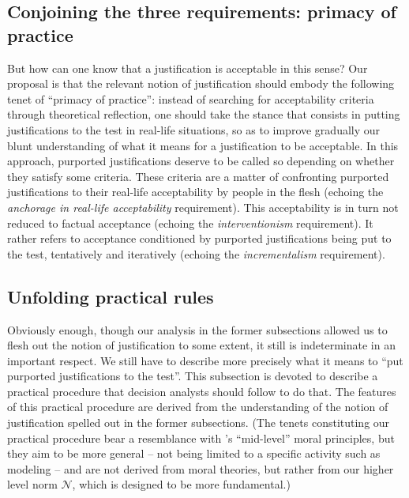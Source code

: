 \documentclass[preprint, french, english, 11pt, authoryear]{elsarticle}%
\begin{document}
\subsection{Conjoining the three requirements: primacy of practice}
But how can one know that a justification is acceptable in this sense? %
Our proposal is that the relevant notion of justification should embody the following tenet of “primacy of practice”: instead of searching for acceptability criteria through theoretical reflection, one should take the stance that consists in putting justifications to the test in real-life situations, so as to improve gradually our blunt understanding of what it means for a justification to be acceptable. In this approach, purported justifications deserve to be called so depending on whether they satisfy some criteria. These criteria are a matter of confronting purported justifications to their real-life acceptability by people in the flesh (echoing the \emph{anchorage in real-life acceptability} requirement). This acceptability is in turn not reduced to factual acceptance (echoing the \emph{interventionism} requirement). It rather refers to acceptance conditioned by purported justifications being put to the test, tentatively and iteratively (echoing the \emph{incrementalism} requirement).

\subsection{Unfolding practical rules}
Obviously enough, though our analysis in the former subsections allowed us to flesh out the notion of justification to some extent, it still is indeterminate in an important respect. We still have to describe more precisely what it means to ``put purported justifications to the test''. This subsection is devoted to describe a practical procedure that decision analysts should follow to do that. The features of this practical procedure are derived from the understanding of the notion of justification spelled out in the former subsections. (The tenets constituting our practical procedure bear a resemblance with \citeauthor{diekmann_moral_2013}’s \citeyearpar{diekmann_moral_2013} ``mid-level'' moral principles, but they aim to be more general -- not being limited to a specific activity such as modeling -- and are not derived from moral theories, but rather from our higher level norm $\mathscr{N}$, which is designed to be more fundamental.)
\end{document}
